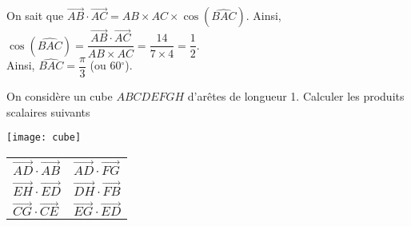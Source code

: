 \documentclass[11pt,fleqn, openany]{book} %
\begin{document}
\begin{solution}On sait que $\overrightarrow{AB}\cdot \overrightarrow{AC}=AB \times AC \times \cos (\widehat{BAC})$. Ainsi, $\cos(\widehat{BAC})=\dfrac{\overrightarrow{AB}\cdot \overrightarrow{AC}}{AB \times AC}=\dfrac{14}{7 \times 4}=\dfrac{1}{2}$. \\ Ainsi, $\widehat{BAC}=\dfrac{\pi}{3}$ (ou 60$^{\circ}$).\end{solution}



\begin{exercise}[topic=geom11]
On considère un cube $ABCDEFGH$ d'arêtes de longueur 1. Calculer les produits scalaires suivants

\begin{minipage}{0.4\linewidth}
\begin{center}
\texttt{[image: cube]}
\end{center}\end{minipage}\hfill \begin{minipage}{0.5\linewidth}

\begin{tabularx}{\linewidth}{XX}
$\overrightarrow{AD} \cdot \overrightarrow{AB}$ & $\overrightarrow{AD} \cdot \overrightarrow{FG}$ \\
$\overrightarrow{EH} \cdot \overrightarrow{ED}$ & $\overrightarrow{DH} \cdot \overrightarrow{FB}$\\
$\overrightarrow{CG} \cdot \overrightarrow{CE}$ & $\overrightarrow{EG} \cdot \overrightarrow{ED}$

\end{tabularx}

\end{minipage}

\end{exercise}
\end{document}
